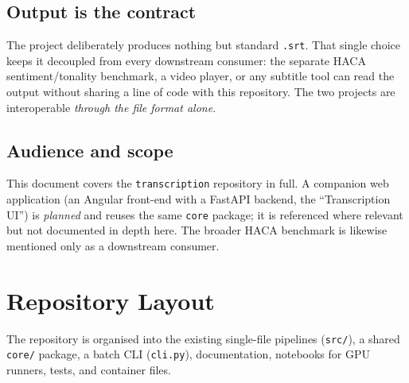 \documentclass[11pt,a4paper]{report}
\begin{document}
\section{Output is the contract}

The project deliberately produces nothing but standard \texttt{.srt}. That single
choice keeps it decoupled from every downstream consumer: the separate HACA
sentiment/tonality benchmark, a video player, or any subtitle tool can read the
output without sharing a line of code with this repository. The two projects are
interoperable \emph{through the file format alone}.

\section{Audience and scope}

This document covers the \texttt{transcription} repository in full. A companion
web application (an Angular front-end with a FastAPI backend, the
``Transcription UI'') is \emph{planned} and reuses the same \texttt{core} package;
it is referenced where relevant but not documented in depth here. The broader HACA
benchmark is likewise mentioned only as a downstream consumer.

\chapter{Repository Layout}

The repository is organised into the existing single-file pipelines
(\texttt{src/}), a shared \texttt{core/} package, a batch CLI (\texttt{cli.py}),
documentation, notebooks for GPU runners, tests, and container files.
\end{document}
